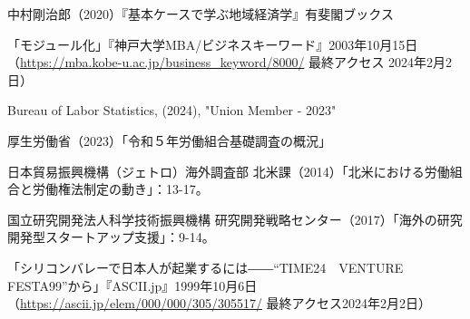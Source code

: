 \documentclass[a4paper]{jsarticle}
\begin{document}
\begin{thebibliography}{9}
  中村剛治郎（2020）『基本ケースで学ぶ地域経済学』有斐閣ブックス

  「モジュール化」『神戸大学MBA/ビジネスキーワード』2003年10月15日（\url{https://mba.kobe-u.ac.jp/business_keyword/8000/} 最終アクセス 2024年2月2日）

  Bureau of Labor Statistics, (2024), "Union Member - 2023"

  厚生労働省（2023）「令和５年労働組合基礎調査の概況」

  日本貿易振興機構（ジェトロ）海外調査部 北米課（2014）「北米における労働組合と労働権法制定の動き」：13-17。

  国立研究開発法人科学技術振興機構 研究開発戦略センター（2017）「海外の研究開発型スタートアップ支援」：9-14。

  「シリコンバレーで日本人が起業するには――“TIME24　VENTURE　FESTA99”から」『ASCII.jp』1999年10月6日（\url{https://ascii.jp/elem/000/000/305/305517/} 最終アクセス2024年2月2日）
\end{thebibliography}
\end{document}
